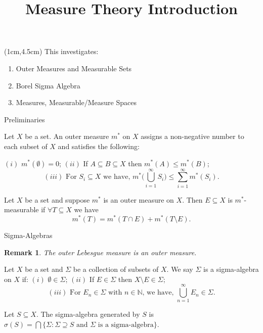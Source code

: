 \documentclass{beamer}
\title{Measure Theory Introduction}
\author{}
\date{}
\newtheorem*{remark}{Remark}
\begin{document}
\begin{frame}
    \titlepage 
    
    
\begin{textblock*}{10cm}(1cm,4.5cm)
This investigates:
\begin{enumerate}
        \item Outer Measures and Measurable Sets
        \item Borel Sigma Algebra
        \item Measures, Measurable/Measure Spaces
    \end{enumerate}
\end{textblock*}    
\end{frame}

\logo{}


\begin{frame}{Preliminaries}
\begin{definition}
Let $X$ be a set. An outer measure $m^{*}$ on $X$ assigns a non-negative number to each subset of $X$ and satisfies the following:

$(i)$ $m^{*}(\emptyset)=0$; $(ii)$ If $A\subseteq B\subseteq X$ then $m^{*}(A)\leq m^{*}(B)$; \newline
$$(iii) \text{ For } S_{i}\subseteq X \text{ we have, }
m^{*}\big(\bigcup_{i=1}^{\infty}S_{i}\big)\leq \sum_{i=1}^{\infty}m^*(S_{i}).$$ 

\end{definition}

\begin{definition}
Let $X$ be a set and suppose $m^{*}$ is an outer measure on $X$. Then $E\subseteq X$ is $m^{*}$-measurable if $\forall T\subseteq X$ we have 
$$m^{*}(T) = m^{*}(T\cap E)+m^{*}(T\setminus E).$$
\end{definition}
\end{frame}



\begin{frame}{Sigma-Algebras}
\begin{remark}
The outer Lebesgue measure is an outer measure.
\end{remark}
\begin{definition}
Let $X$ be a set and $\Sigma$ be a collection of subsets of $X$. We say $\Sigma$ is a sigma-algebra on $X$ if:
$(i)$ $\emptyset\in\Sigma$; $(ii)$ If $E\in\Sigma$ then $X\setminus E\in\Sigma$;
$$(iii) \text{ For } E_{n}\in\Sigma \text{ with } n\in\mathbb{N}\text{, } \text{we have, } 
\bigcup_{n=1}^{\infty}E_{n}\in\Sigma.$$
\end{definition}

Let $S\subseteq X$. The sigma-algebra generated by $S$ is $\sigma(S)=\bigcap\big\{\Sigma:\Sigma\supseteq S \text{ and } \Sigma \text{ is a sigma-algebra}\big\}$.


\end{frame}
    
\end{document}
